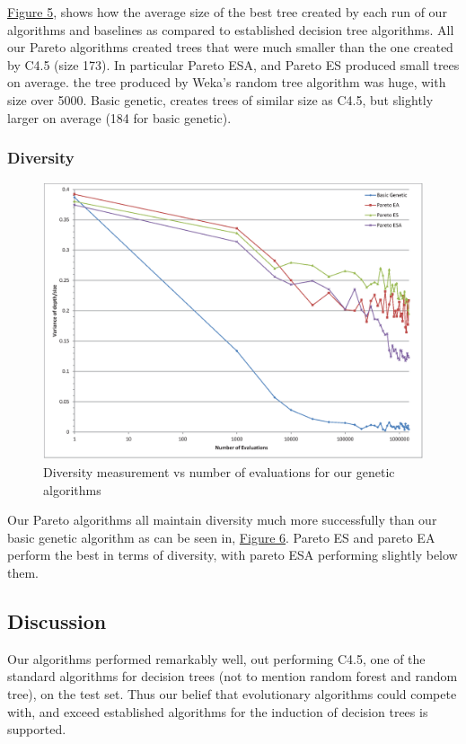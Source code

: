 \documentclass{acm_proc_article-sp}
\begin{document}
\hyperref[size]{Figure 5}, shows how the average size of the best tree created by each run of our algorithms and baselines as compared to established decision tree algorithms. All our Pareto algorithms created trees that were much smaller than the one created by C4.5 (size 173). In particular Pareto ESA, and Pareto ES produced small trees on average. the tree produced by Weka's \cite{Hall:2009} random tree algorithm was huge, with size over 5000. Basic genetic, creates trees of similar size as C4.5, but slightly larger on average (184 for basic genetic).

\subsubsection{Diversity}

\begin{figure}[h]
\centering
\includegraphics[width=\linewidth]{diversity_chart.eps}
\caption{Diversity measurement vs number of evaluations for our genetic algorithms}\label{diversity}
\end{figure}

Our Pareto algorithms all maintain diversity much more successfully than our basic genetic algorithm as can be seen in, \hyperref[diversity]{Figure 6}. Pareto ES and pareto EA perform the best in terms of diversity, with pareto ESA performing slightly below them.

\subsection{Discussion}

Our algorithms performed remarkably well, out performing C4.5, one of the standard algorithms for decision trees (not to mention random forest and random tree), on the test set. Thus our belief that evolutionary algorithms could compete with, and exceed established algorithms for the induction of decision trees is supported.
\end{document}
